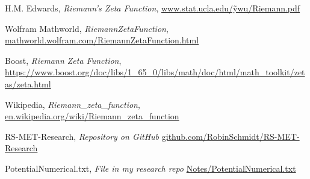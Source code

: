 \documentclass[12pt]{article}
\begin{document}
\begin{thebibliography}{9}
	
 H.M. Edwards, \textit{Riemann's Zeta Function},
\href{http://www.stat.ucla.edu/~ywu/Riemann.pdf}{www.stat.ucla.edu/\~ywu/Riemann.pdf}

 Wolfram Mathworld, \textit{RiemannZetaFunction},
\href{https://mathworld.wolfram.com/RiemannZetaFunction.html}{mathworld.wolfram.com/RiemannZetaFunction.html}

 Boost, \textit{Riemann Zeta Function}, \\
\href{https://www.boost.org/doc/libs/1_65_0/libs/math/doc/html/math_toolkit/zetas/zeta.html}{https://www.boost.org/doc/libs/1\_65\_0/libs/math/doc/html/math\_toolkit/zetas/zeta.html}

 Wikipedia, \textit{Riemann\_zeta\_function},
\href{https://en.wikipedia.org/wiki/Riemann_zeta_function}{en.wikipedia.org/wiki/Riemann\_zeta\_function}

 RS-MET-Research, \textit{Repository on GitHub}
\href{https://github.com/RobinSchmidt/RS-MET-Research}{github.com/RobinSchmidt/RS-MET-Research}

 PotentialNumerical.txt, \textit{File in my research repo}
\href{https://github.com/RobinSchmidt/RS-MET-Research/blob/master/Notes/PotentialNumerical.txt}{Notes/PotentialNumerical.txt}



\end{thebibliography}
 
 
\end{document}
